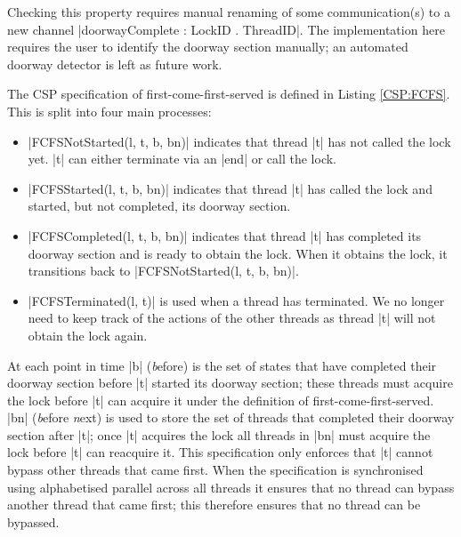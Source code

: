 Checking this property requires manual renaming of some communication(s) to a new channel |doorwayComplete : LockID . ThreadID|. The implementation here requires the user to identify the doorway section manually; an automated doorway detector is left as future work.

The CSP specification of first-come-first-served is defined in Listing \ref{CSP:FCFS}. This is split into four main processes:
\begin{itemize}
  \item |FCFSNotStarted(l, t, b, bn)| indicates that thread |t| has not called the lock yet. |t| can either terminate via an |end| or call the lock.
  \item |FCFSStarted(l, t, b, bn)| indicates that thread |t| has called the lock and started, but not completed, its doorway section.
  \item |FCFSCompleted(l, t, b, bn)| indicates that thread |t| has completed its doorway section and is ready to obtain the lock. When it obtains the lock, it transitions back to |FCFSNotStarted(l, t, b, bn)|.
  \item |FCFSTerminated(l, t)| is used when a thread has terminated. We no longer need to keep track of the actions of the other threads as thread |t| will not obtain the lock again. 
\end{itemize}

At each point in time |b| (\emph{b}efore) is the set of states that have completed their doorway section before |t| started its doorway section; these threads must acquire the lock before |t| can acquire it under the definition of first-come-first-served. |bn| (\emph{b}efore \emph{n}ext) is used to store the set of threads that completed their doorway section after |t|; once |t| acquires the lock all threads in |bn| must acquire the lock before |t| can reacquire it. This specification only enforces that |t| cannot bypass other threads that came first. When the specification is synchronised using alphabetised parallel across all threads it ensures that no thread can bypass another thread that came first; this therefore ensures that no thread can be bypassed.


